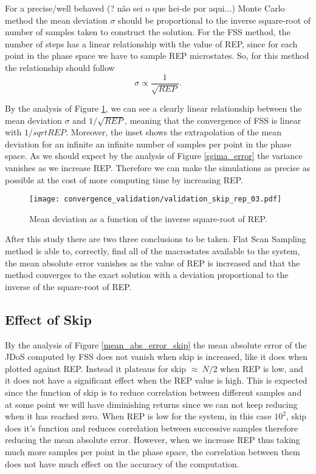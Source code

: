 	For a precise/well behaved (? não sei o que hei-de por aqui...) Monte Carlo method the mean deviation $\sigma$ should be proportional to the inverse square-root of number of samples taken to construct the solution. For the FSS method, the number of steps has a linear relationship with the value of REP, since for each point in the phase space we have to sample REP microstates. So, for this method the relationship should follow 
\begin{equation}
	\sigma \propto \frac{1}{\sqrt{REP}}.
\end{equation}

	By the analysis of Figure \ref{sigma_rep}, we can see a clearly linear relationship between the mean deviation $\sigma$ and $1/\sqrt{REP}$, meaning that the convergence of FSS is linear with $1/sqrt{REP}$. Moreover, the inset shows the extrapolation of the mean deviation for an infinite an infinite number of samples per point in the phase space. As we should expect by the analysis of Figure \ref{sgima_error} the variance vanishes as we increase REP. Therefore we can make the simulations as precise as possible at the cost of more computing time by increasing REP.
	
\begin{figure}[h]
	\centering
	\texttt{[image: convergence\_validation/validation\_skip\_rep\_03.pdf]}
	\caption{Mean deviation as a function of the inverse square-root of REP.}
	\label{sigma_rep}
\end{figure}

	After this study there are two three conclusions to be taken. Flat Scan Sampling method is able to, correctly, find all of the macrostates available to the system, the mean absolute error vanishes as the value of REP is increased and that the method converges to the exact solution with a deviation proportional to the inverse of the square-root of REP.

\subsection{Effect of Skip}

	By the analysis of Figure \ref{mean_abs_error_skip} the mean absolute error of the JDoS computed by FSS does not vanish when skip is increased, like it does when plotted against REP. Instead it plateaus for skip $\approx\ N/2$ when REP is low, and it does not have a significant effect when the REP value is high. This is expected since the function of skip is to reduce correlation between different samples and at some point we will have diminishing returns since we can not keep reducing when it has reached zero. 
When REP is low for the system, in this case $10^2$, skip does it's function and reduces correlation between successive samples therefore reducing the mean absolute error. 
However, when we increase REP thus taking much more samples per point in the phase space, the correlation between them does not have much effect on the accuracy of the computation. 

